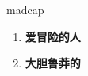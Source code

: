 
\begin{frame}
{\huge madcap}
\begin{center}
\begin{enumerate}\Large
  \item \textbf{爱冒险的人}
  \item \textbf{大胆鲁莽的}
\end{enumerate}
\end{center}
\end{frame}
